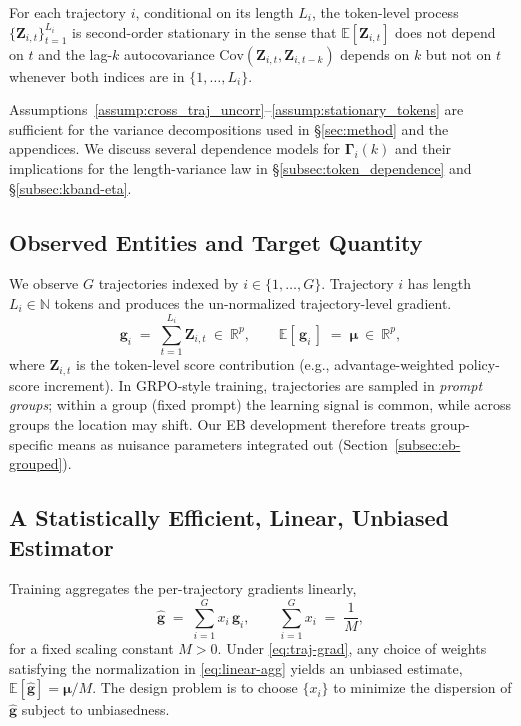 \begin{assumption}\label{assump:stationary_tokens}
For each trajectory $i$, conditional on its length $L_i$, the token-level process $\{\boldsymbol{Z}_{i,t}\}_{t=1}^{L_i}$ is second-order stationary in the sense that
$\mathbb{E}[\boldsymbol{Z}_{i,t}]$ does not depend on $t$ and the lag-$k$ autocovariance
$\mathrm{Cov}(\boldsymbol{Z}_{i,t},\boldsymbol{Z}_{i,t-k})$ depends on $k$ but not on $t$ whenever both indices are in $\{1,\dots,L_i\}$.
\end{assumption}

Assumptions~\ref{assump:cross_traj_uncorr}--\ref{assump:stationary_tokens} are sufficient for the variance decompositions used in \S\ref{sec:method} and the appendices.
We discuss several dependence models for $\boldsymbol{\Gamma}_i(k)$ and their implications for the length-variance law in \S\ref{subsec:token_dependence} and \S\ref{subsec:kband-eta}.

\subsection{Observed Entities and Target Quantity}
We observe $G$ trajectories indexed by $i\in\{1,\dots,G\}$. Trajectory $i$ has length $L_i\in\mathbb{N}$ tokens and produces the un-normalized trajectory-level gradient.
\begin{equation}
  \boldsymbol{g}_i \;=\; \sum_{t=1}^{L_i} \boldsymbol{Z}_{i,t}\ \in\ \mathbb{R}^{p},
  \qquad
  \mathbb{E}\!\left[\,\boldsymbol{g}_i\,\right] \;=\; \boldsymbol{\mu}\ \in\ \mathbb{R}^{p},
  \label{eq:traj-grad}
\end{equation}
where $\boldsymbol{Z}_{i,t}$ is the token-level score contribution (e.g., advantage-weighted policy-score increment). In GRPO-style training, trajectories are sampled in \emph{prompt groups}; within a group (fixed prompt) the learning signal is common, while across groups the location may shift. Our EB development therefore treats group-specific means as nuisance parameters integrated out (Section~\ref{subsec:eb-grouped}).

\subsection{A Statistically Efficient, Linear, Unbiased Estimator}
Training aggregates the per-trajectory gradients linearly,
\begin{equation}
  \widehat{\boldsymbol{g}}
  \;=\;
  \sum_{i=1}^{G} x_i\,\boldsymbol{g}_i,
  \qquad
  \sum_{i=1}^{G} x_i \;=\; \frac{1}{M},
  \label{eq:linear-agg}
\end{equation}
for a fixed scaling constant $M>0$. Under \eqref{eq:traj-grad}, any choice of weights satisfying the normalization in \eqref{eq:linear-agg} yields an unbiased estimate, $\mathbb{E}[\widehat{\boldsymbol{g}}]=\boldsymbol{\mu}/M$. The design problem is to choose $\{x_i\}$ to minimize the dispersion of $\widehat{\boldsymbol{g}}$ subject to unbiasedness.

